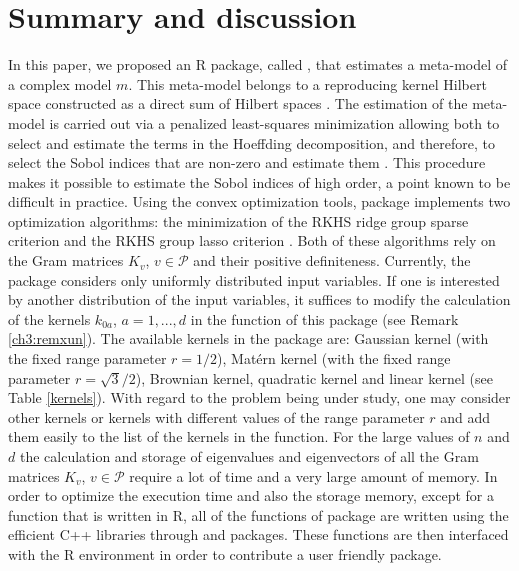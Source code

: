 \section{Summary and discussion} \label{sec:summary}
In this paper, we proposed an R package, called , that estimates a meta-model of a complex model $m$. This meta-model belongs to a reproducing kernel Hilbert space constructed as a direct sum of Hilbert spaces \citep{DURRANDE201357}. The estimation of the meta-model is carried out via a penalized least-squares minimization allowing both to select and estimate the terms in the Hoeffding decomposition, and therefore, to select the Sobol indices that are non-zero and estimate them \citep{huet:hal-01434895}. This procedure makes it possible to estimate the Sobol indices of high order, a point known to be difficult in practice.
Using the convex optimization tools,  package implements two optimization algorithms: the minimization of the RKHS ridge group sparse criterion  and the RKHS group lasso criterion . 
Both of these algorithms rely on the Gram matrices $K_v$, $v\in\mathcal{P}$ and their positive definiteness. 
Currently, the package considers only uniformly distributed input variables. If one is interested by another distribution of the input variables, it suffices to modify the calculation of the kernels $k_{0a}$, $a=1,...,d$ in the function  of this package (see Remark \ref{ch3:remxun}). 
The available kernels in the  package are: Gaussian kernel (with the fixed range parameter $r=1/2$), Matérn kernel (with the fixed range parameter $r=\sqrt{3}/2$), Brownian kernel, quadratic kernel and linear kernel (see Table \ref{kernels}). With regard to the problem being under study, one may consider other kernels or kernels with different values of the range parameter $r$ and add them easily to the list of the kernels in the  function.  
For the large values of $n$ and $d$ the calculation and storage of eigenvalues and eigenvectors of all the Gram matrices $K_v$, $v\in\mathcal{P}$ require a lot of time and a very large amount of memory. In order to optimize the execution time and also the storage memory, except for a function that is written in R, all of the functions of  package are written using the efficient C++ libraries through  and  packages. These functions are then interfaced with the R environment in order to contribute a user friendly package. 
\vspace{0.3cm}


